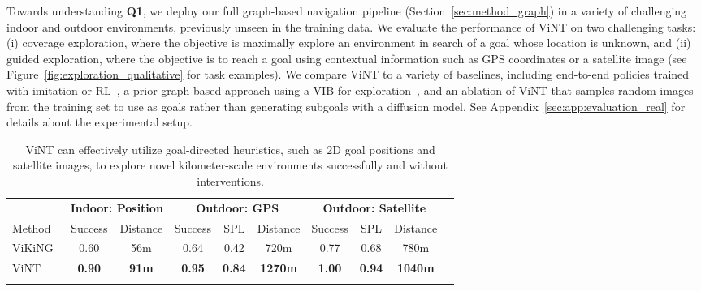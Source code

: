 \documentclass{article}
\newcommand{\ModelName}{ViNT\xspace}
\newcommand{\ours}[0]{\rowcolor{LimeGreen!30}}
\begin{document}
Towards understanding \textbf{Q1}, we deploy our full graph-based navigation pipeline (Section~\ref{sec:method_graph}) in a variety of challenging indoor and outdoor environments, previously unseen in the training data. We evaluate the performance of \ModelName on two challenging tasks: (i) coverage exploration, where the objective is maximally explore an environment in search of a goal whose location is unknown, and (ii) guided exploration, where the objective is to reach a goal using contextual information such as GPS coordinates or a satellite image (see Figure~\ref{fig:exploration_qualitative} for task examples). We compare \ModelName to a variety of baselines, including end-to-end policies trained with imitation or RL~\cite{kahn2018gcg,truong2023i2o}, a prior graph-based approach using a VIB for exploration~\cite{shah2021rapid}, and an ablation of \ModelName that samples random images from the training set to use as goals rather than generating subgoals with a diffusion model. See Appendix~\ref{sec:app:evaluation_real} for details about the experimental setup.

\begin{table}
    \centering
    \vspace{-1em}
    {\footnotesize
    \begin{tabular}{lccccccccc}
        \toprule
        & \multicolumn{2}{c}{\bf Indoor: Position} & \multicolumn{3}{c}{\bf Outdoor: GPS} & \multicolumn{3}{c}{\bf Outdoor: Satellite} \\
        \cmidrule(lr){2-3} \cmidrule(lr){4-6} \cmidrule(lr){7-9} Method & Success & Distance & Success & SPL & Distance & Success & SPL & Distance \\
        \midrule
        ViKiNG~\cite{shah2022viking} & 0.60 & 56m & 0.64 & 0.42 & 720m & 0.77 & 0.68 & 780m \\
        \ours \ModelName & \textbf{0.90} & \textbf{91m} & \textbf{0.95} & \textbf{0.84} & \textbf{1270m} & \textbf{1.00} & \textbf{0.94} & \textbf{1040m} \\
        \bottomrule \\
    \end{tabular}}
    \caption{\ModelName can effectively utilize goal-directed heuristics, such as 2D goal positions and satellite images, to explore novel kilometer-scale environments successfully and without interventions.}
    \label{tab:viking-results}
\end{table}
\end{document}
